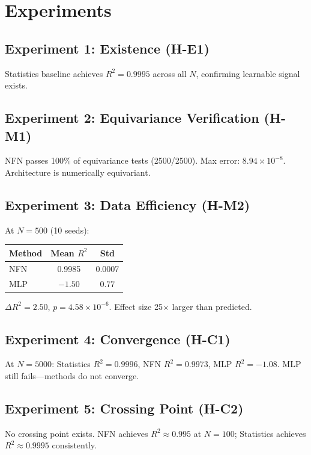 \section{Experiments}

\subsection{Experiment 1: Existence (H-E1)}

Statistics baseline achieves $R^2 = 0.9995$ across all $N$, confirming learnable signal exists.

\subsection{Experiment 2: Equivariance Verification (H-M1)}

NFN passes 100\% of equivariance tests (2500/2500). Max error: $8.94 \times 10^{-8}$. Architecture is numerically equivariant.

\subsection{Experiment 3: Data Efficiency (H-M2)}

At $N=500$ (10 seeds):

\begin{table}[h]
\centering
\begin{tabular}{lcc}
\toprule
\textbf{Method} & \textbf{Mean $R^2$} & \textbf{Std} \\
\midrule
NFN & 0.9985 & 0.0007 \\
MLP & $-1.50$ & 0.77 \\
\bottomrule
\end{tabular}
\end{table}

$\Delta R^2 = 2.50$, $p = 4.58 \times 10^{-6}$. Effect size 25$\times$ larger than predicted.

\subsection{Experiment 4: Convergence (H-C1)}

At $N=5000$: Statistics $R^2 = 0.9996$, NFN $R^2 = 0.9973$, MLP $R^2 = -1.08$. MLP still fails---methods do not converge.

\subsection{Experiment 5: Crossing Point (H-C2)}

No crossing point exists. NFN achieves $R^2 \approx 0.995$ at $N=100$; Statistics achieves $R^2 \approx 0.9995$ consistently.
